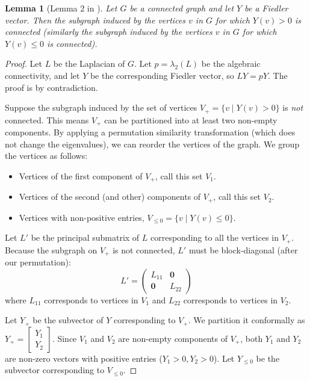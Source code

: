 \documentclass[12pt,a4paper]{report}
\theoremstyle{plain}
\newtheorem{lemma}[theorem]{Lemma}
\theoremstyle{definition}
\theoremstyle{remark}
\begin{document}
\begin{lemma}[Lemma 2 in \cite{main_paper}]
Let $G$ be a connected graph and let $Y$ be a Fiedler vector. Then the subgraph induced by the vertices $v$ in $G$ for which $Y(v) > 0$ is connected (similarly the subgraph induced by the vertices $v$ in $G$ for which $Y(v) \le 0$ is connected).
\end{lemma}

\begin{proof}
Let $L$ be the Laplacian of $G$. Let $p = \lambda_2(L)$ be the algebraic connectivity, and let $Y$ be the corresponding Fiedler vector, so $LY = pY$.
The proof is by contradiction.

Suppose the subgraph induced by the set of vertices $V_+ = \{v \mid Y(v) > 0\}$ is \textit{not} connected.
This means $V_+$ can be partitioned into at least two non-empty components. By applying a permutation similarity transformation (which does not change the eigenvalues), we can reorder the vertices of the graph. We group the vertices as follows:
\begin{itemize}
    \item Vertices of the first component of $V_+$, call this set $V_1$.
    \item Vertices of the second (and other) components of $V_+$, call this set $V_2$.
    \item Vertices with non-positive entries, $V_{\le 0} = \{v \mid Y(v) \le 0\}$.
\end{itemize}
Let $L'$ be the principal submatrix of $L$ corresponding to all the vertices in $V_+$. Because the subgraph on $V_+$ is not connected, $L'$ must be block-diagonal (after our permutation):
$$ L' = \begin{pmatrix} L_{11} & \mathbf{0} \\ \mathbf{0} & L_{22} \end{pmatrix} $$
where $L_{11}$ corresponds to vertices in $V_1$ and $L_{22}$ corresponds to vertices in $V_2$.

Let $Y_+$ be the subvector of $Y$ corresponding to $V_+$. We partition it conformally as $Y_+ = \begin{bmatrix} Y_1 \\ Y_2 \end{bmatrix}$. Since $V_1$ and $V_2$ are non-empty components of $V_+$, both $Y_1$ and $Y_2$ are non-zero vectors with positive entries ($Y_1 > 0, Y_2 > 0$).
Let $Y_{\le 0}$ be the subvector corresponding to $V_{\le 0}$.


\end{proof}
\end{document}

